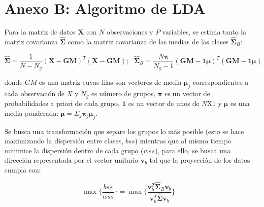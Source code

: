 \documentclass[12pt]{article}
\begin{document}
\newpage
\section*{Anexo B: Algoritmo de LDA}

Para la matriz de datos $\mathbf{X}$ con $N$ observaciones y $P$ variables, se estima tanto la matriz covarianza $\hat{\boldsymbol{\Sigma}}$ como la matriz covarianza de las medias de las clases $\hat{\boldsymbol{\Sigma}}_B$:

\begin{equation} \label{eq:cov}
\hat{\boldsymbol{\Sigma}} = \frac{1}{N-N_g} (\mathbf{X} - \mathbf{GM})^T (\mathbf{X} - \mathbf{GM}); \text{  }
\hat{\boldsymbol{\Sigma}}_B = \frac{N \boldsymbol{\pi}}{N_g - 1} (\mathbf{GM} - \mathbf{1}\boldsymbol{\mu})^T (\mathbf{GM} - \mathbf{1}\boldsymbol{\mu})
\end{equation}

donde $GM$ es una matriz cuyas filas son vectores de media $\boldsymbol{\mu}_j$ correspondientes a cada observación de $X$ y $N_g$ es número de grupos, $\boldsymbol{\pi}$ es un vector de probabilidades a priori de cada grupo, $\mathbf{1}$ es un vector de unos de $N$X$1$ y $\boldsymbol{\mu}$ es una media ponderada: $\boldsymbol{\mu} = \Sigma_j \boldsymbol{\pi}_j \boldsymbol{\mu}_j$.

Se busca una transformación que separe los grupos lo más posible (esto se hace maximizando la dispersión entre clases, $bss$) mientras que al mismo tiempo minimice la dispersión dentro de cada grupo ($wss$), para ello, se busca una dirección representada por el vector unitario $\mathbf{v}_b$ tal que la proyección de los datos cumpla con:

\begin{equation} \label{eq:maxratio}
\max\{\frac{bss}{wss}\} = \max\{\frac{\mathbf{v}_b^T \hat{\boldsymbol{\Sigma}}_B \mathbf{v}_b}{\mathbf{v}_b^T \hat{\boldsymbol{\Sigma}} \mathbf{v}_b}\}
\end{equation}
\end{document}
